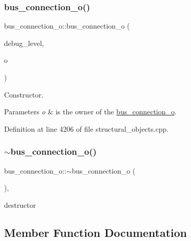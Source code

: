 \subsubsection{\texorpdfstring{bus\+\_\+connection\+\_\+o()}{bus\_connection\_o()}}
{\footnotesize\ttfamily bus\+\_\+connection\+\_\+o\+::bus\+\_\+connection\+\_\+o (\begin{DoxyParamCaption}\item[{int}]{debug\+\_\+level,  }\item[{const \hyperlink{structural__objects_8hpp_a8ea5f8cc50ab8f4c31e2751074ff60b2}{structural\+\_\+object\+Ref}}]{o }\end{DoxyParamCaption})}



Constructor. 


\begin{DoxyParams}{Parameters}
{\em o} & is the owner of the \hyperlink{classbus__connection__o}{bus\+\_\+connection\+\_\+o}. \\
\hline
\end{DoxyParams}


Definition at line 4206 of file structural\+\_\+objects.\+cpp.

\mbox{\label{classbus__connection__o_ab5e4bb277a16d2d50835d5f0065efa7a}} 
\subsubsection{\texorpdfstring{$\sim$bus\+\_\+connection\+\_\+o()}{~bus\_connection\_o()}}
{\footnotesize\ttfamily bus\+\_\+connection\+\_\+o\+::$\sim$bus\+\_\+connection\+\_\+o (\begin{DoxyParamCaption}{ }\end{DoxyParamCaption})\hspace{0.3cm}{\ttfamily [override]}, {\ttfamily [default]}}



destructor 



\subsection{Member Function Documentation}
\mbox{\label{classbus__connection__o_aad176147ffe4df3512c00d3f58fa0b73}} 
